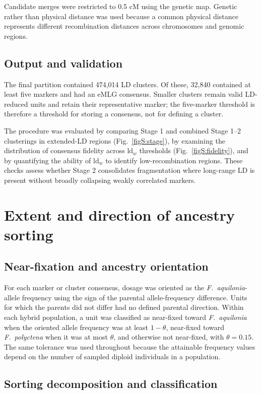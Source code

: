\documentclass[11pt]{article}
\newcommand{\Faq}{\textit{F.~aquilonia}}
\newcommand{\Fpo}{\textit{F.~polyctena}}
\begin{document}
Candidate merges were restricted to 0.5 cM using the genetic map. Genetic rather
than physical distance was used because a common physical distance represents
different recombination distances across chromosomes and genomic regions.

\subsection{Output and validation}

The final partition contained 474,014 LD clusters. Of these, 32,840 contained
at least five markers and had an eMLG consensus. Smaller
clusters remain valid LD-reduced units and retain their representative marker;
the five-marker threshold is therefore a threshold for storing a consensus,
not for defining a cluster.

The procedure was evaluated by comparing Stage 1 and combined Stage 1--2
clusterings in extended-LD regions (Fig.~\ref{figS:stage}), by examining the
distribution of consensus fidelity across \(\mathrm{ld}_w\) thresholds
(Fig.~\ref{figS:fidelity}), and by quantifying the ability of
\(\mathrm{ld}_w\) to identify low-recombination regions. These checks assess
whether Stage 2 consolidates fragmentation where long-range LD is present
without broadly collapsing weakly correlated markers.

\section{Extent and direction of ancestry sorting}

\subsection{Near-fixation and ancestry orientation}

For each marker or cluster consensus, dosage was oriented as the
\Faq-allele frequency using the sign of the parental allele-frequency
difference. Units for which the parents did not differ had no defined parental
direction. Within each hybrid population, a unit was classified as near-fixed
toward \Faq{} when the oriented allele frequency was at least
\(1-\theta\), near-fixed toward \Fpo{} when it was at most \(\theta\), and
otherwise not near-fixed, with \(\theta=0.15\). The same tolerance was used
throughout because the attainable frequency values depend on the number of
sampled diploid individuals in a population.

\subsection{Sorting decomposition and classification}
\end{document}
